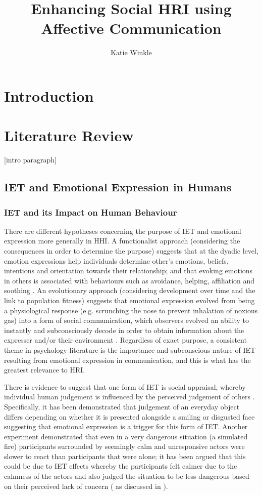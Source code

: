 \documentclass[11pt,a4paper]{report}
\title{Enhancing Social HRI using Affective Communication}
\author{Katie Winkle}
\begin{document}
\maketitle
\tableofcontents

\chapter{Introduction}

\chapter{Literature Review}
[intro paragraph]
\section{IET and Emotional Expression in Humans}

\subsection{IET and its Impact on Human Behaviour}
There are different hypotheses concerning the purpose of IET and emotional expression more generally in HHI. A functionalist approach (considering the consequences in order to determine the purpose) suggests that at the dyadic level, emotion expressions help individuals determine other's emotions, beliefs, intentions and orientation towards their relationship; and that evoking emotions in others is associated with behaviours such as avoidance, helping, affiliation and soothing \cite{keltner1999social}. An evolutionary approach (considering development over time and the link to population fitness) suggests that emotional expression evolved from being a physiological response (e.g. scrunching the nose to prevent inhalation of noxious gas) into a form of social communication, which observers evolved an ability to instantly and subconsciously decode in order to obtain information about the expresser and/or their environment \cite{shariff2011emotion}. Regardless of exact purpose, a consistent theme in psychology literature is the importance and subconscious nature of IET resulting from emotional expression in communication, and this is what has the greatest relevance to HRI. 

There is evidence to suggest that one form of IET is social appraisal, whereby individual human judgement is influenced by the perceived judgement of others \cite{parkinson2011interpersonal}. Specifically, it has been demonstrated that judgement of an everyday object differs depending on whether it is presented alongside a smiling or disgusted face \cite{bayliss2007affective} suggesting that emotional expression is a trigger for this form of IET. Another experiment demonstrated that even in a very dangerous situation (a simulated fire) participants surrounded by seemingly calm and unresponsive actors were slower to react than participants that were alone; it has been argued that this could be due to IET effects whereby the participants felt calmer due to the calmness of the actors and also judged the situation to be less dangerous based on their perceived lack of concern (\cite{latane1968group} as discussed in \cite{parkinson2011interpersonal}).
\end{document}
